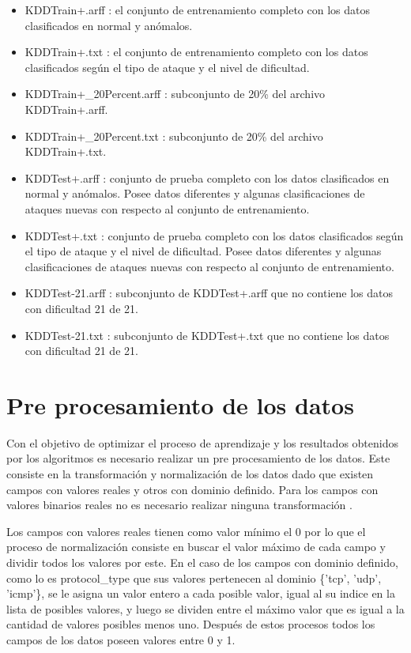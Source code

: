 \begin{itemize}
    \item KDDTrain+.arff : el conjunto de entrenamiento completo con los datos clasificados en normal y anómalos.
    \item KDDTrain+.txt : el conjunto de entrenamiento completo con los datos clasificados según el tipo de ataque y el nivel de dificultad.
    \item KDDTrain+\_20Percent.arff : subconjunto de 20\% del archivo KDDTrain+.arff.
    \item KDDTrain+\_20Percent.txt : subconjunto de 20\% del archivo KDDTrain+.txt.
    \item KDDTest+.arff : conjunto de prueba completo con los datos clasificados en normal y anómalos. Posee datos diferentes y algunas clasificaciones de ataques nuevas con respecto al conjunto de entrenamiento.
    \item KDDTest+.txt : conjunto de prueba completo con los datos clasificados según el tipo de ataque y el nivel de dificultad. Posee datos diferentes y algunas clasificaciones de ataques nuevas con respecto al conjunto de entrenamiento.
    \item KDDTest-21.arff : subconjunto de KDDTest+.arff que no contiene los datos con dificultad 21 de 21.
    \item KDDTest-21.txt : subconjunto de KDDTest+.txt que no contiene los datos con dificultad 21 de 21.
\end{itemize}

\section{Pre procesamiento de los datos}
Con el objetivo de optimizar el proceso de aprendizaje y los resultados obtenidos por los algoritmos es necesario realizar un pre procesamiento de los datos. Este consiste en la transformación y normalización de los datos dado que existen campos con valores reales y otros con dominio definido. Para los campos con valores binarios reales no es necesario realizar ninguna transformación \cite{patro2015normalization}.

Los campos con valores reales tienen como valor mínimo el 0 por lo que el proceso de normalización consiste en buscar el valor máximo de cada campo y dividir todos los valores por este. En el caso de los campos con dominio definido, como lo es protocol\_type que sus valores pertenecen al dominio \{'tcp', 'udp', 'icmp'\}, se le asigna un valor entero a cada posible valor, igual al su indice en la lista de posibles valores, y luego se dividen entre el máximo valor que es igual a la cantidad de valores posibles menos uno. Después de estos procesos todos los campos de los datos poseen valores entre 0 y 1.

